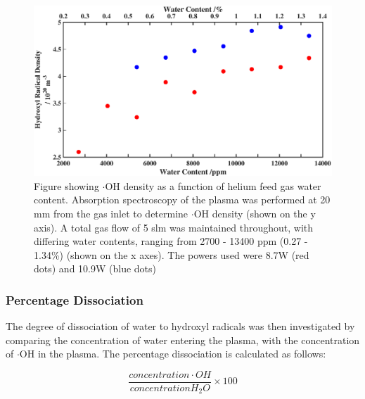 \documentclass[11pt, oneside]{article}   	%
\begin{document}
\begin{figure}
    \centering
    \includegraphics[width=\textwidth]{Figures/WaterVariationNew}
    \caption{Figure showing $\cdot$OH density as a function of helium feed gas water content. Absorption spectroscopy of the plasma was performed at 20 mm from the gas inlet to determine $\cdot$OH density (shown on the y axis). A total gas flow of 5 slm was maintained throughout, with differing water contents, ranging from 2700 - 13400 ppm (0.27 - 1.34\%) (shown on the x axes). The powers used were 8.7W (red dots) and 10.9W (blue dots)}
    \label{fig:BubblerVariation}
\end{figure}


\subsubsection{Percentage Dissociation}

The degree of dissociation of water to hydroxyl radicals was then investigated by comparing the concentration of water entering the plasma, with the concentration of $\cdot$OH in the plasma.
The percentage dissociation is calculated as follows:

\begin{equation} \label{eqn:PercentDiss}
	\frac{concentration \cdot OH}{concentration  H_2O} \times 100
\end{equation}
\end{document}
